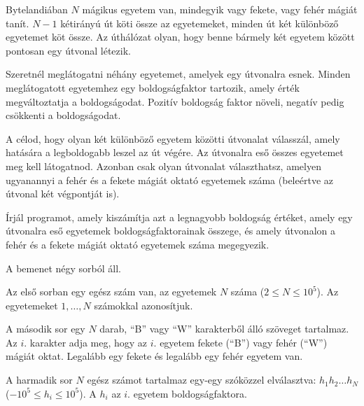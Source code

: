 





Bytelandiában $N$ mágikus egyetem van, mindegyik vagy fekete, vagy fehér mágiát tanít. $N-1$ kétirányú út köti össze az egyetemeket, minden út két különböző egyetemet köt össze. Az úthálózat olyan, hogy benne bármely két egyetem között pontosan egy útvonal létezik.

Szeretnél meglátogatni néhány egyetemet, amelyek egy útvonalra esnek.
Minden meglátogatott egyetemhez egy boldogságfaktor tartozik, amely érték megváltoztatja a boldogságodat. Pozitív boldogság faktor növeli, negatív pedig csökkenti a boldogságodat.

A célod, hogy olyan két különböző egyetem közötti útvonalat válasszál, amely hatására a legboldogabb leszel az út végére. Az útvonalra eső összes egyetemet meg kell látogatnod. Azonban csak olyan útvonalat választhatsz, amelyen ugyanannyi a fehér és a fekete mágiát oktató egyetemek száma (beleértve az útvonal két végpontját is). 



Írjál programot, amely kiszámítja azt a legnagyobb boldogság értéket, amely egy útvonalra eső egyetemek boldogságfaktorainak összege, és amely útvonalon a fehér és a fekete mágiát oktató egyetemek száma megegyezik.



A bemenet négy sorból áll.

Az első sorban egy egész szám van, az egyetemek $N$ száma ($2 \leq N \leq 10^5$). Az egyetemeket $1, \ldots, N$ számokkal azonosítjuk.

A második sor egy $N$ darab, ``B'' vagy ``W'' karakterből álló szöveget tartalmaz. Az $i$. karakter adja meg, hogy az $i$. egyetem fekete (``B'') vagy fehér (``W'') mágiát oktat. Legalább egy fekete és legalább egy fehér egyetem van.

A harmadik sor $N$ egész számot tartalmaz egy-egy szóközzel elválasztva: $h_1 h_2 \ldots h_N$ ($-10^5 \leq h_i \leq 10^5$). A $h_i$ az $i$. egyetem boldogságfaktora.

